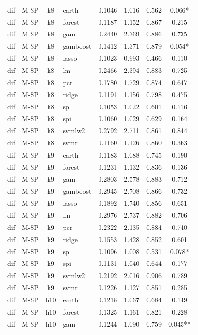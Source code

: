 \begin{ThreePartTable}
\begin{longtable}[t]{llclcccc}
dif & M-SP & h8 & earth & 0.1046 & 1.016 & 0.562 & 0.066*\\
dif & M-SP & h8 & forest & 0.1187 & 1.152 & 0.867 & 0.215\\
dif & M-SP & h8 & gam & 0.2440 & 2.369 & 0.886 & 0.735\\
dif & M-SP & h8 & gamboost & 0.1412 & 1.371 & 0.879 & 0.054*\\
dif & M-SP & h8 & lasso & 0.1023 & 0.993 & 0.466 & 0.110\\
dif & M-SP & h8 & lm & 0.2466 & 2.394 & 0.883 & 0.725\\
dif & M-SP & h8 & pcr & 0.1780 & 1.729 & 0.874 & 0.647\\
dif & M-SP & h8 & ridge & 0.1191 & 1.156 & 0.798 & 0.475\\
dif & M-SP & h8 & sp & 0.1053 & 1.022 & 0.601 & 0.116\\
dif & M-SP & h8 & spi & 0.1060 & 1.029 & 0.629 & 0.164\\
dif & M-SP & h8 & svmlw2 & 0.2792 & 2.711 & 0.861 & 0.844\\
dif & M-SP & h8 & svmr & 0.1160 & 1.126 & 0.860 & 0.363\\
\addlinespace
dif & M-SP & h9 & earth & 0.1183 & 1.088 & 0.745 & 0.190\\
dif & M-SP & h9 & forest & 0.1231 & 1.132 & 0.836 & 0.136\\
dif & M-SP & h9 & gam & 0.2803 & 2.578 & 0.883 & 0.712\\
dif & M-SP & h9 & gamboost & 0.2945 & 2.708 & 0.866 & 0.732\\
dif & M-SP & h9 & lasso & 0.1892 & 1.740 & 0.856 & 0.651\\
dif & M-SP & h9 & lm & 0.2976 & 2.737 & 0.882 & 0.706\\
dif & M-SP & h9 & pcr & 0.2322 & 2.135 & 0.884 & 0.740\\
dif & M-SP & h9 & ridge & 0.1553 & 1.428 & 0.852 & 0.601\\
dif & M-SP & h9 & sp & 0.1096 & 1.008 & 0.531 & 0.078*\\
dif & M-SP & h9 & spi & 0.1131 & 1.040 & 0.644 & 0.177\\
dif & M-SP & h9 & svmlw2 & 0.2192 & 2.016 & 0.906 & 0.789\\
dif & M-SP & h9 & svmr & 0.1226 & 1.127 & 0.851 & 0.285\\
\addlinespace
dif & M-SP & h10 & earth & 0.1218 & 1.067 & 0.684 & 0.149\\
dif & M-SP & h10 & forest & 0.1325 & 1.161 & 0.821 & 0.228\\
dif & M-SP & h10 & gam & 0.1244 & 1.090 & 0.759 & 0.045**\\

\end{longtable}
\end{ThreePartTable}
